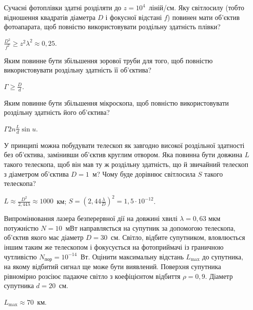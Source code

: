 \begin{problem}%
    Сучасні фотоплівки здатні розділяти до $ z = 10^4 $~ліній/см. Яку світлосилу (тобто відношення квадратів діаметра $ D $ і фокусної відстані $ f $) повинен мати об'єктив фотоапарата, щоб повністю використовувати роздільну здатність плівки?
    \begin{solution}
        $\frac{D^2}{f^2} \ge z^2\lambda^2 \approx 0,25$.
    \end{solution}
\end{problem}


\begin{problem}%
    Яким повинне бути збільшення зорової труби для того, щоб повністю
    використовувати роздільну здатність її об'єктива?
    \begin{solution}
        $\Gamma \ge \frac{D}{d}$.
    \end{solution}
\end{problem}


\begin{problem}%
    Яким повинне бути збільшення мікроскопа, щоб повністю використовувати роздільну здатність його об'єктива?
    \begin{solution}
        $\Gamma 2n  \frac{L}{d}\sin u$.
    \end{solution}
\end{problem}


\begin{problem}%
    У принципі можна побудувати телескоп як завгодно високої роздільної здатності без об'єктива, замінивши об'єктив круглим отвором. Яка повинна бути довжина $ L $ такого телескопа, щоб він мав ту ж роздільну здатність, що й звичайний телескоп з діаметром об'єктива $ D = 1 $~м? Чому буде дорівнює світлосила $ S $ такого телескопа?
    \begin{solution}
        $L \approx \frac{D^2}{2,44 \lambda} \approx 1000$~км; $ S = \left( 2,44\frac{\lambda}{D} \right)^2 = 1,5\cdot10^{-12}$.
    \end{solution}
\end{problem}


\begin{problem}%
    Випромінювання лазера безперервної дії на довжині хвилі $ \lambda = 0,63 $ мкм потужністю $ N = 10 $~мВт направляється на супутник за допомогою телескопа, об'єктив якого має діаметр $ D = 30 $~см. Світло, відбите супутником, вловлюється іншим таким же телескопом і фокусується на фотоприймачі із граничною чутливістю $ N_\text{пор} = 10^{-14} $~Вт. Оцінити максимальну відстань $ L_{\max} $ до супутника, на якому відбитий сигнал ще може бути виявлений. Поверхня супутника рівномірно розсіює падаюче світло з коефіцієнтом відбиття $ \rho = 0,9 $. Діаметр супутника $ d = 20 $~см.
    \begin{solution}
        $L_{\max} \approx 70$~км.
    \end{solution}
\end{problem}


